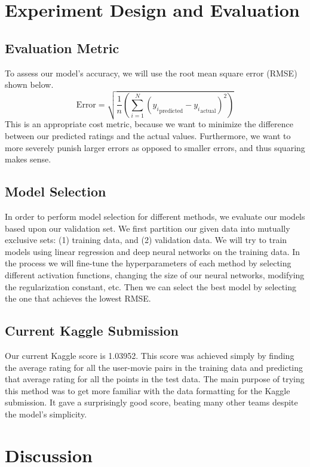 \documentclass[11pt]{article}
\begin{document}
\section{Experiment Design and Evaluation}

\subsection{Evaluation Metric}

To assess our model's accuracy, we will use the root mean square error (RMSE) shown below.
\[\text{Error}=\sqrt{\frac{1}{n}\left(\sum_{i=1}^N \left({y_i}_\text{predicted}-{y_i}_\text{actual}\right)^2\right)}\]
This is an appropriate cost metric, because we want to minimize the difference between our predicted
ratings and the actual values. Furthermore, we want to more severely punish larger errors as opposed
to smaller errors, and thus squaring makes sense.

\subsection{Model Selection}

In order to perform model selection for different methods, we evaluate our models based upon our validation set.
We first partition our given data into mutually exclusive sets: (1) training data, and (2) validation data.
We will try to train models using linear regression and deep neural networks on the training data.
In the process we will fine-tune the hyperparameters of each method by selecting different activation functions,
changing the size of our neural networks, modifying the regularization constant, etc. Then we can select the best
model by selecting the one that achieves the lowest RMSE.

\subsection{Current Kaggle Submission}

Our current Kaggle score is 1.03952. This score was achieved simply by finding the average rating for
all the user-movie pairs in the training data and predicting that average rating for all the points in the
test data. The main purpose of trying this method was to get more familiar with the data formatting for the
Kaggle submission. It gave a surprisingly good score, beating many other teams despite the model’s simplicity.

\section{Discussion}
\end{document}
